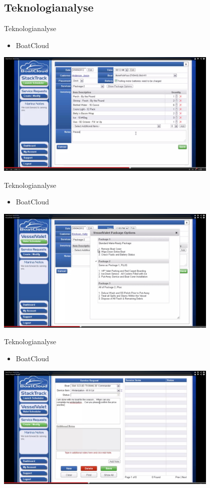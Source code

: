 \subsection{Teknologianalyse}
\begin{frame}{Teknologianalyse}
  \begin{itemize}
    \item BoatCloud
  \end{itemize}
        \includegraphics[width=0.8\textwidth]{images/StackTrack.jpg}
\end{frame}

\begin{frame}{Teknologianalyse}
  \begin{itemize}
    \item BoatCloud
  \end{itemize}
        \includegraphics[width=0.8\textwidth]{images/VesselValet.jpg}
  
\end{frame}

\begin{frame}{Teknologianalyse}
  \begin{itemize}
    \item BoatCloud
  \end{itemize}
        \includegraphics[width=0.8\textwidth]{images/TicketTracker.jpg}
  
\end{frame}

